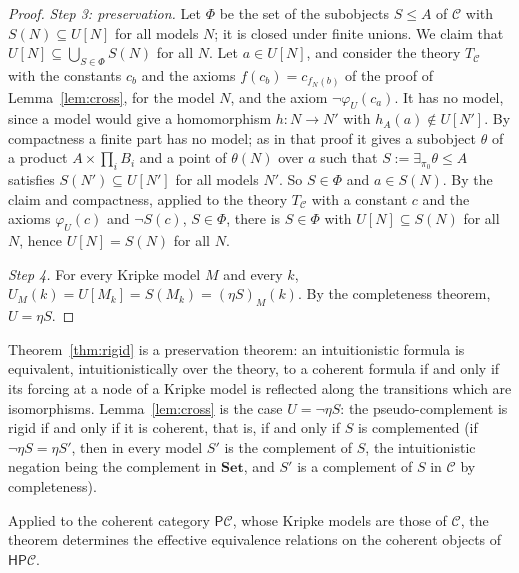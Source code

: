 \documentclass[11pt]{amsart}
\theoremstyle{definition}
\newcommand{\Set}{\mathbf{Set}}
\newcommand{\PP}{\mathsf P}
\newcommand{\HH}{\mathsf H}
\newcommand{\cC}{\mathcal C}
\begin{document}
\begin{proof}
\emph{Step 3: preservation.} Let $\Phi$ be the set of the subobjects
$S\le A$ of $\cC$ with $S(N)\subseteq U[N]$ for all models $N$; it is
closed under finite unions. We claim that $U[N]\subseteq\bigcup_{S\in
\Phi}S(N)$ for all $N$. Let $a\in U[N]$, and consider the theory
$T_\cC$ with the constants $c_b$ and the axioms $f(c_b)=c_{f_N(b)}$ of
the proof of Lemma~\ref{lem:cross}, for the model $N$, and the axiom
$\neg\varphi_U(c_a)$. It has no model, since a model would give a
homomorphism $h\colon N\to N'$ with $h_A(a)\notin U[N']$. By
compactness a finite part has no model; as in that proof it gives a
subobject $\theta$ of a product $A\times\prod_iB_i$ and a point of
$\theta(N)$ over $a$ such that $S:=\exists_{\pi_0}\theta\le A$
satisfies $S(N')\subseteq U[N']$ for all models $N'$. So $S\in\Phi$
and $a\in S(N)$. By the claim and compactness, applied to the theory
$T_\cC$ with a constant $c$ and the axioms $\varphi_U(c)$ and $\neg
S(c)$, $S\in\Phi$, there is $S\in\Phi$ with $U[N]\subseteq S(N)$ for
all $N$, hence $U[N]=S(N)$ for all $N$.

\emph{Step 4.} For every Kripke model $M$ and every $k$,
$U_M(k)=U[M_k]=S(M_k)=(\eta S)_M(k)$. By the completeness theorem,
$U=\eta S$.
\end{proof}

Theorem~\ref{thm:rigid} is a preservation theorem: an intuitionistic
formula is equivalent, intuitionistically over the theory, to a
coherent formula if and only if its forcing at a node of a Kripke model
is reflected along the transitions which are isomorphisms.
Lemma~\ref{lem:cross} is the case $U=\neg\eta S$: the
pseudo-complement is rigid if and only if it is coherent, that is, if
and only if $S$ is complemented (if $\neg\eta S=\eta S'$, then in every
model $S'$ is the complement of $S$, the intuitionistic negation being
the complement in $\Set$, and $S'$ is a complement of $S$ in $\cC$ by
completeness).

Applied to the coherent category $\PP\cC$, whose Kripke models are
those of $\cC$, the theorem determines the effective equivalence
relations on the coherent objects of $\HH\PP\cC$.
\end{document}
